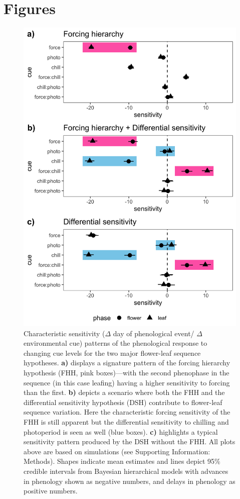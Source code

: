 \documentclass[11pt]{article}\usepackage[]{graphicx}\usepackage[]{color}
\begin{document}
\section*{Figures}
\begin{figure}[h!]
    \centering
         \includegraphics[width=.7\textwidth]{..//Plots/Flobuds_manuscript_figs/simulations.png}
    \caption{Characteristic sensitivity ($\Delta$ day of phenological event/ $\Delta$ environmental cue) patterns of the phenological response to changing cue levels for the two major flower-leaf sequence hypotheses.  \textbf{a)} displays a signature pattern of the forcing hierarchy hypothesis (FHH, pink boxes)---with the second phenophase in the sequence (in this case leafing) having a higher sensitivity to forcing than the first. \textbf{b)} depicts a scenario where both the FHH and the differential sensitivity hypothesis (DSH) contribute to flower-leaf sequence variation. Here the characteristic forcing sensitivity of the FHH is still apparent but the differential sensitivity to chilling and photoperiod is seen as well (blue boxes). \textbf{c)} highlights a typical sensitivity pattern produced by the DSH without the FHH. All plots above are based on simulations (see Supporting Information: Methods). Shapes indicate mean estimates and lines depict 95\% credible intervals from Bayesian hierarchical models with advances in phenology shown as negative numbers, and delays in phenology as positive numbers. } 
    \label{fig:simulations}
\end{figure}
\clearall %
\end{document}

